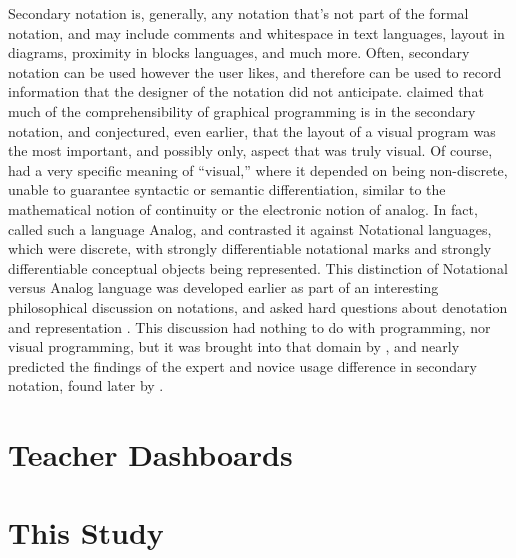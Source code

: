 Secondary notation is, generally, any notation that's not part of the formal notation, and may include comments and whitespace in text languages, layout in diagrams, proximity in blocks languages, and much more. Often, secondary notation can be used however the user likes, and therefore can be used to record information that the designer of the notation did not anticipate. \citet{petre-1995} claimed that much of the comprehensibility of graphical programming is in the secondary notation, and \citet{raymond-1991} conjectured, even earlier, that the layout of a visual program was the most important, and possibly only, aspect that was truly visual. Of course, \citeauthor{raymond-1991} had a very specific meaning of ``visual,'' where it depended on being non-discrete, unable to guarantee syntactic or semantic differentiation, similar to the mathematical notion of continuity or the electronic notion of analog. In fact, \citeauthor{raymond-1991} called such a language Analog, and contrasted it against Notational languages, which were discrete, with strongly differentiable notational marks and strongly differentiable conceptual objects being represented. This distinction of Notational versus Analog language was developed earlier as part of an interesting philosophical discussion on notations, and asked hard questions about denotation and representation \citep{goodman-1976}. This discussion had nothing to do with programming, nor visual programming, but it was brought into that domain by \citeauthor{raymond-1991}, and nearly predicted the findings of the expert and novice usage difference in secondary notation, found later by \citet{petre-2006}.

\section{Teacher Dashboards}
\label{sec:teacher-dashboards}

\section{This Study}

